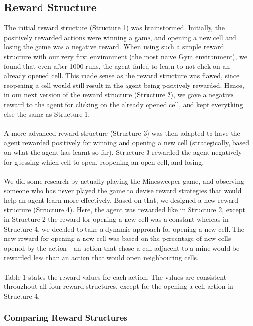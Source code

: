 \subsection{Reward Structure}
The initial reward structure (Structure 1) was brainstormed. Initially, the positively rewarded actions were winning a game, and opening a new cell and losing the game was a negative reward. When using such a simple reward structure with our very first environment (the most naive Gym environment), we found that even after 1000 runs, the agent failed to learn to not click on an already opened cell. This made sense as the reward structure was flawed, since reopening a cell would still result in the agent being positively rewarded. Hence, in our next version of the reward structure (Structure 2), we gave a negative reward to the agent for clicking on the already opened cell, and kept everything else the same as Structure 1.
\\\\
A more advanced reward structure (Structure 3) was then adapted to have the agent rewarded positively for winning and opening a new cell (strategically, based on what the agent has learnt so far). Structure 3 rewarded the agent negatively for guessing which cell to open, reopening an open cell, and losing.
\\\\
We did some research by actually playing the Minesweeper game, and observing someone who has never played the game to devise reward strategies that would help an agent learn more effectively. Based on that, we designed a new reward structure (Structure 4). Here, the agent was rewarded like in Structure 2, except in Structure 2 the reward for opening a new cell was a constant whereas in Structure 4, we decided to take a dynamic approach for opening a new cell. The new reward for opening a new cell was based on the percentage of new cells opened by the action - an action that chose a cell adjacent to a mine would be rewarded less than an action that would open neighbouring cells.
\\\\
Table 1 states the reward values for each action. The values are consistent throughout all four reward structures, except for the opening a cell action in Structure 4.



\subsubsection{Comparing Reward Structures}

